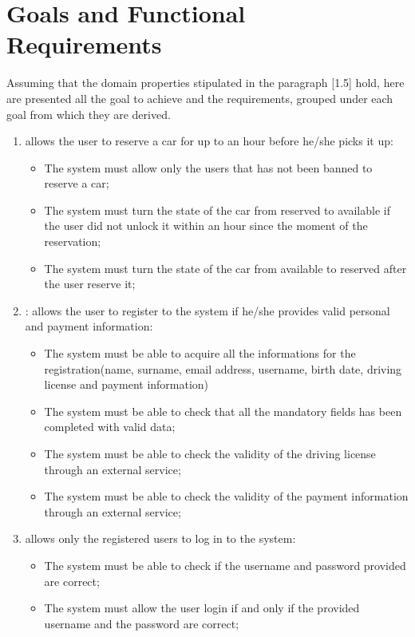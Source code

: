 \section{Goals and Functional Requirements}
Assuming that the domain properties stipulated in the paragraph [1.5] hold, here are presented all the goal to  achieve and the requirements, grouped under each goal from which they are derived.

\begin{enumerate}

\item allows the user to reserve a car for up to an hour before he/she picks it up:

\begin{itemize}
	\item The system must allow only the users that has not been banned to reserve a car;
	\item The system must turn the state of the car from reserved to available if the user did not unlock it within an hour since the moment of the reservation;
	\item The system must turn the state of the car from available to reserved after the user reserve it;
\end{itemize}

\item: allows the user to register to the system if he/she provides valid personal and payment information:

\begin{itemize}
	\item The system must be able to acquire all the informations for the registration(name, surname, email address, username, birth date, driving license and payment information)
	\item The system must be able to check that all the mandatory fields has been completed with valid data;
	\item The system must be able to check the validity of the driving license through an external service;
	\item The system must be able to check the validity of the payment information through an external service;
\end{itemize}

\item allows only the registered users to log in to the system:

\begin{itemize}
	\item The system must be able to check if the username and password provided are correct;
	\item The system must allow the user login if and only if the provided username and the password are correct;
\end{itemize}


\end{enumerate}
